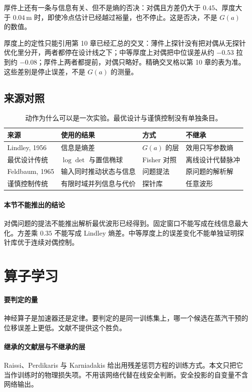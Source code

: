 厚件上还有一条与信息有关、但不是熵的否决：对偶且方差仍大于 $0.45$、厚度大于 $0.04\,\mathrm{m}$ 时，即使冷点估计已经越过裕量，也不停止。这是否决，不是 $G(a)$ 的数值。

厚度上的定性只能引用第 10 章已经汇总的交叉：薄件上探针没有把对偶从无探针优化里分开，两者都停在设计线之下；中等厚度上对偶把中位误差从约 $-0.53$ 拉到约 $-0.08$；厚件上两者都提前，对偶只略好。精确交叉格以第 10 章的表为准。这些差别是停止误差，不是 $G(a)$ 的测量。

\subsection{来源对照}
\begin{table}[ht]
\centering
\caption{动作为什么可以是一次实验。最优设计与谨慎控制没有单独条目。}
\begin{tabularx}{\textwidth}{lXll}
\toprule
来源 & 使用的结果 & 方式 & 不继承 \\
\midrule
Lindley, 1956 & 信息是熵差 & \(G(a)\) 的层 & 效用只写参数熵 \\
最优设计传统 & \(\log\det\) 与置信椭球 & Fisher 对照 & 离线设计代替脉冲 \\
Feldbaum, 1965 & 输入同时推动状态与信息 & 问题提法 & 原问题的解析解 \\
谨慎控制传统 & 有限时域并列信息与代价 & 探针库 & 任意波形 \\
\bottomrule
\end{tabularx}
\end{table}

\paragraph{本节不能推出的结论}
对偶问题的提法不能推出解析最优波形已经得到。固定窗口不能写成在线信息最大化。方差乘 $0.35$ 不能写成 Lindley 熵差。中等厚度上的误差变化不能单独证明探针库优于连续对偶控制。

\section{算子学习}

\paragraph{要判定的量}
神经算子是加速器还是定律。要判定的是同一训练集上，哪一个候选在蒸汽干预的位移误差上更低。文献不提供这个胜负。

\paragraph{继承的文献层与不继承的层}
Raissi、Perdikaris 与 Karniadakis 给出用残差惩罚方程的训练方式\cite{raissi2019}。本文只把它当作训练时的物理损失项。不用该网络代替在线安全判断。安全投影的自变量不含网络输出。

